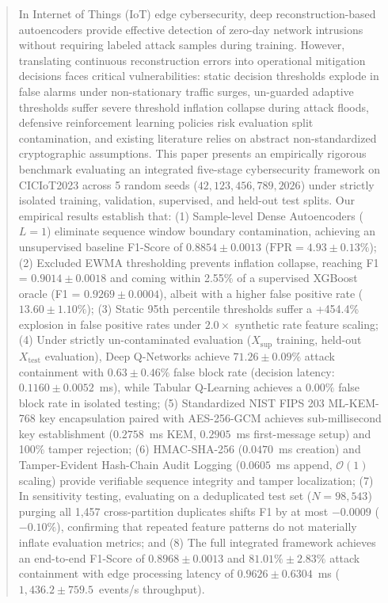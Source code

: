 \documentclass{ieeeaccess}
\begin{document}
\begin{abstract}
In Internet of Things (IoT) edge cybersecurity, deep reconstruction-based autoencoders provide effective detection of zero-day network intrusions without requiring labeled attack samples during training. However, translating continuous reconstruction errors into operational mitigation decisions faces critical vulnerabilities: static decision thresholds explode in false alarms under non-stationary traffic surges, un-guarded adaptive thresholds suffer severe threshold inflation collapse during attack floods, defensive reinforcement learning policies risk evaluation split contamination, and existing literature relies on abstract non-standardized cryptographic assumptions. This paper presents an empirically rigorous benchmark evaluating an integrated five-stage cybersecurity framework on CICIoT2023 across 5 random seeds ($42, 123, 456, 789, 2026$) under strictly isolated training, validation, supervised, and held-out test splits. Our empirical results establish that: (1) Sample-level Dense Autoencoders ($L=1$) eliminate sequence window boundary contamination, achieving an unsupervised baseline F1-Score of $0.8854 \pm 0.0013$ ($\text{FPR} = 4.93 \pm 0.13\%$); (2) Excluded EWMA thresholding prevents inflation collapse, reaching F1 = $0.9014 \pm 0.0018$ and coming within 2.55\% of a supervised XGBoost oracle (F1 = $0.9269 \pm 0.0004$), albeit with a higher false positive rate ($13.60 \pm 1.10\%$); (3) Static 95th percentile thresholds suffer a +454.4\% explosion in false positive rates under $2.0\times$ synthetic rate feature scaling; (4) Under strictly un-contaminated evaluation ($X_{\text{sup}}$ training, held-out $X_{\text{test}}$ evaluation), Deep Q-Networks achieve $71.26 \pm 0.09\%$ attack containment with $0.63 \pm 0.46\%$ false block rate (decision latency: $0.1160 \pm 0.0052$~ms), while Tabular Q-Learning achieves a $0.00\%$ false block rate in isolated testing; (5) Standardized NIST FIPS 203 ML-KEM-768 key encapsulation paired with AES-256-GCM achieves sub-millisecond key establishment ($0.2758$~ms KEM, $0.2905$~ms first-message setup) and 100\% tamper rejection; (6) HMAC-SHA-256 ($0.0470$~ms creation) and Tamper-Evident Hash-Chain Audit Logging ($0.0605$~ms append, $\mathcal{O}(1)$ scaling) provide verifiable sequence integrity and tamper localization; (7) In sensitivity testing, evaluating on a deduplicated test set ($N=98,543$) purging all 1,457 cross-partition duplicates shifts F1 by at most $-0.0009$ ($-0.10\%$), confirming that repeated feature patterns do not materially inflate evaluation metrics; and (8) The full integrated framework achieves an end-to-end F1-Score of $0.8968 \pm 0.0013$ and $81.01\% \pm 2.83\%$ attack containment with edge processing latency of $0.9626 \pm 0.6304$~ms ($1,436.2 \pm 759.5$~events/s throughput).
\end{abstract}
\end{document}
